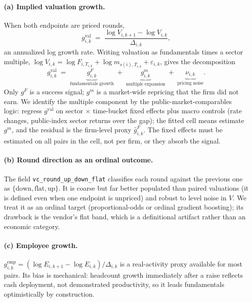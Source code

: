 \paragraph{(a) Implied valuation growth.}
When both endpoints are priced rounds,
\begin{equation}
g^{\mathrm{val}}_{i,k} \;=\; \frac{\log V_{i,k+1} - \log V_{i,k}}{\Delta_{i,k}},
\label{eq:us-gval}
\end{equation}
an annualized log growth rate. Writing valuation as fundamentals times a sector multiple,
$\log V_{i,k} = \log F_{i,T_{i,k}} + \log m_{s(i),T_{i,k}} + \varepsilon_{i,k}$, gives the
decomposition
\begin{equation}
g^{\mathrm{val}}_{i,k}
\;=\; \underbrace{g^{F}_{i,k}}_{\text{fundamentals growth}}
\;+\; \underbrace{g^{m}_{i,k}}_{\text{multiple expansion}}
\;+\; \underbrace{\nu_{i,k}}_{\text{pricing noise}} .
\label{eq:us-decomp}
\end{equation}
Only $g^{F}$ is a success signal; $g^{m}$ is a market-wide repricing that the firm did not
earn. We identify the multiple component by the public-market-comparables logic: regress
$g^{\mathrm{val}}$ on sector $\times$ time-bucket fixed effects plus macro controls (rate
changes, public-index sector returns over the gap); the fitted cell means estimate
$g^{m}$, and the residual is the firm-level proxy $\hat{g}^{F}_{i,k}$. The fixed effects
must be estimated on all pairs in the cell, not per firm, or they absorb the signal.

\paragraph{(b) Round direction as an ordinal outcome.}
The field \texttt{vc\_round\_up\_down\_flat} classifies each round against the previous one
as $\{\text{down}, \text{flat}, \text{up}\}$. It is coarse but far better populated than
paired valuations (it is defined even when one endpoint is unpriced) and robust to
level noise in $V$. We treat it as an ordinal target (proportional-odds or ordinal
gradient boosting); its drawback is the vendor's flat band, which is a definitional
artifact rather than an economic category.

\paragraph{(c) Employee growth.}
$g^{\mathrm{emp}}_{i,k} = (\log E_{i,k+1} - \log E_{i,k})/\Delta_{i,k}$ is a real-activity
proxy available for most pairs. Its bias is mechanical: headcount growth immediately after
a raise reflects cash deployment, not demonstrated productivity, so it leads fundamentals
optimistically by construction.

